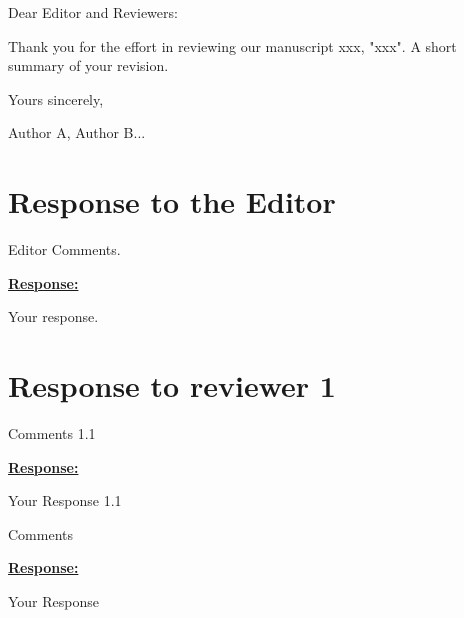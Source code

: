 \documentclass{article}
\begin{document}
\noindent
Dear Editor and Reviewers:

\vspace{0.2cm}
\noindent
Thank you for the effort in reviewing our manuscript xxx, "xxx". 
A short summary of your revision.

\vspace{0.2cm}
\noindent
Yours sincerely,

\noindent
Author A, Author B...



\section*{Response to the Editor} 
\begin{cmt*}{}{}
Editor Comments.
\end{cmt*}

\vspace{0.1cm}
\noindent
\underline{\textbf{Response:}}
\vspace{0.2cm}

Your response. 




\newpage
\section{Response to reviewer 1} 

\begin{cmt}{}{}

Comments 1.1

\end{cmt}
\vspace{0.1cm}
\noindent
\underline{\textbf{Response:}}
\vspace{0.2cm}

Your Response 1.1

\vspace{0.3cm}


\begin{cmt*}{}{}        %

Comments

\end{cmt*}
\vspace{0.1cm}
\noindent
\underline{\textbf{Response:}}
\vspace{0.2cm}

Your Response 
\end{document}
